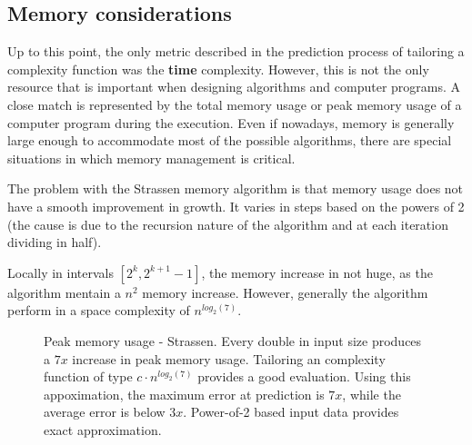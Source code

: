 \subsection{Memory considerations}

Up to this point, the only metric described in the prediction process of tailoring a complexity function was the \textbf{time} complexity. However, this is not the only resource that is important when designing algorithms and computer programs. A close match is represented by the total memory usage or peak memory usage of a computer program during the execution. Even if nowadays, memory is generally large enough to accommodate most of the possible algorithms, there are special situations in which memory management is critical.

The problem with the Strassen memory algorithm is that memory usage does not have a smooth improvement in growth. It varies in steps based on the powers of 2 (the cause is due to the recursion nature of the algorithm and at each iteration dividing in half).

Locally in intervals $[2^k, 2^{k+1} - 1]$, the memory increase in not huge, as the algorithm mentain a $n^2$ memory increase. However, generally the algorithm perform in a space complexity of $n^{log_{2}(7)}$.

\begin{figure}[H]
\caption{Peak memory usage - Strassen. Every double in input size produces a $7x$ increase in peak memory usage. Tailoring an complexity function of type $c \cdot n^{log_2(7)}$ provides a good evaluation. Using this appoximation, the maximum error at prediction is $7x$, while the average error is below $3x$. Power-of-2 based input data provides exact approximation.}
\end{figure}

